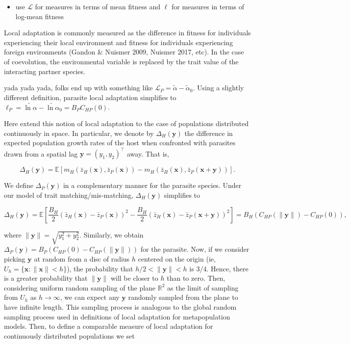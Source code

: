 \documentclass{article}
\begin{document}
\begin{itemize}
\tightlist
\item
  use \(\mathcal L\) for measures in terms of mean fitness and \(\ell\)
  for measures in terms of log-mean fitness
\end{itemize}

Local adaptation is commonly measured as the difference in fitness for
individuals experiencing their local environment and fitness for
individuals experiencing foreign environments (Gandon \& Nuismer 2009,
Nuismer 2017, etc). In the case of coevolution, the environmental
variable is replaced by the trait value of the interacting partner
species.

yada yada yada, folks end up with something like
\(\mathcal L_P=\tilde\alpha-\tilde\alpha_0\). Using a slightly different
definition, parasite local adaptation simplifies to
\(\ell_P=\widetilde{\ln\alpha}-\widetilde{\ln\alpha}_0=B_PC_{HP}(0)\).

Here extend this notion of local adaptation to the case of populations
distributed continuously in space. In particular, we denote by
\(\Delta_H(\pmb y)\) the difference in expected population growth rates
of the host when confronted with parasites drawn from a spatial lag
\(\pmb y=(y_1,y_2)^\top\) away. That is,

\[\Delta_H(\pmb y)=\mathbb E[m_H(\bar z_H(\pmb x),\bar z_P(\pmb x))-m_H(\bar z_H(\pmb x),\bar z_P(\pmb x+\pmb y))].\]

We define \(\Delta_P(\pmb y)\) in a complementary manner for the
parasite species. Under our model of trait matching/mis-matching,
\(\Delta_H(\pmb y)\) simplifies to

\[\Delta_H(\pmb y)=\mathbb E\left[\frac{B_H}{2}\left(\bar z_H(\pmb x)-\bar z_P(\pmb x)\right)^2-\frac{B_H}{2}\left(\bar z_H(\pmb x)-\bar z_P(\pmb x+\pmb y)\right)^2\right]=B_H\left(C_{HP}(\|\pmb y\|)-C_{HP}(0)\right),\]

where \(\|\pmb y\|=\sqrt{y_1^2+y_2^2}\). Similarly, we obtain
\(\Delta_P(\pmb y)=B_P(C_{HP}(0)-C_{HP}(\|\pmb y\|))\) for the parasite.
Now, if we consider picking \(\pmb y\) at random from a disc of radius
\(h\) centered on the origin (ie, \(U_h=\{\pmb x:\|\pmb x\|<h\}\)), the
probability that \(h/2<\|\pmb y\|<h\) is \(3/4\). Hence, there is a
greater probability that \(\|\pmb y\|\) will be closer to \(h\) than to
zero. Then, considering uniform random sampling of the plane
\(\mathbb R^2\) as the limit of sampling from \(U_h\) as \(h\to\infty\),
we can expect any \(\pmb y\) randomly sampled from the plane to have
infinite length. This sampling process is analogous to the global random
sampling process used in definitions of local adaptation for
metapopulation models. Then, to define a comparable measure of local
adaptation for continuously distributed populations we set
\end{document}
